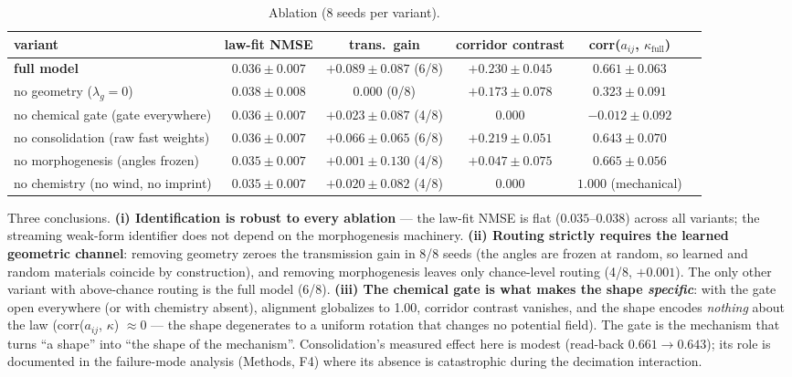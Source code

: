 \documentclass[10pt]{article}
\begin{document}
\begin{table}[h]
\centering\footnotesize
\caption{Ablation (8 seeds per variant).}
\begin{tabular}{L{3.1cm}ccccc}
\toprule
variant & law-fit NMSE & trans.\ gain & corridor contrast & corr($a_{ij}$, $\kappa_{\mathrm{full}}$) \\
\midrule
\textbf{full model} & $0.036 \pm 0.007$ & $+0.089 \pm 0.087$ (6/8) & $+0.230 \pm 0.045$ & $0.661 \pm 0.063$ \\
no geometry ($\lambda_g = 0$) & $0.038 \pm 0.008$ & $0.000$ (0/8) & $+0.173 \pm 0.078$ & $0.323 \pm 0.091$ \\
no chemical gate (gate everywhere) & $0.036 \pm 0.007$ & $+0.023 \pm 0.087$ (4/8) & $0.000$ & $-0.012 \pm 0.092$ \\
no consolidation (raw fast weights) & $0.036 \pm 0.007$ & $+0.066 \pm 0.065$ (6/8) & $+0.219 \pm 0.051$ & $0.643 \pm 0.070$ \\
no morphogenesis (angles frozen) & $0.035 \pm 0.007$ & $+0.001 \pm 0.130$ (4/8) & $+0.047 \pm 0.075$ & $0.665 \pm 0.056$ \\
no chemistry (no wind, no imprint) & $0.035 \pm 0.007$ & $+0.020 \pm 0.082$ (4/8) & $0.000$ & $1.000$ (mechanical) \\
\bottomrule
\end{tabular}
\end{table}

Three conclusions. \textbf{(i) Identification is robust to every ablation} --- the
law-fit NMSE is flat ($0.035$--$0.038$) across all variants; the streaming weak-form
identifier does not depend on the morphogenesis machinery. \textbf{(ii) Routing strictly
requires the learned geometric channel}: removing geometry zeroes the transmission gain
in 8/8 seeds (the angles are frozen at random, so learned and random materials coincide
by construction), and removing morphogenesis leaves only chance-level routing (4/8,
$+0.001$). The only other variant with above-chance routing is the full model (6/8).
\textbf{(iii) The chemical gate is what makes the shape \emph{specific}}: with the gate
open everywhere (or with chemistry absent), alignment globalizes to 1.00, corridor
contrast vanishes, and the shape encodes \emph{nothing} about the law
(corr($a_{ij}$, $\kappa$) $\approx 0$ --- the shape degenerates to a uniform rotation
that changes no potential field). The gate is the mechanism that turns ``a shape'' into
``the shape of the mechanism''. Consolidation's measured effect here is modest
(read-back $0.661 \to 0.643$); its role is documented in the failure-mode analysis
(Methods, F4) where its absence is catastrophic during the decimation interaction.
\end{document}

